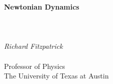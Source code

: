 \documentclass[12pt]{rfbook}
\def\theequation{\arabic{chapter}.\arabic{equation}}
\def\thefigure{\arabic{chapter}.\arabic{figure}}
\def\thetable{\arabic{chapter}.\arabic{table}}
\begin{document}
\thispagestyle{empty}
\begin{center}
{\Huge\bf Newtonian Dynamics}\\[1ex]
~\\
~\\
~\\
{\Large\em  Richard Fitzpatrick}\\[1.5ex]~\\[1.5ex]
{\Large\sf  Professor  of Physics}\\[1.5ex]
{\Large\sf  The University of Texas at Austin}
\end{center}

\pagestyle{fancy}
\renewcommand{\chaptermark}[1]{\markboth{#1}{}}
\fancyhf{}
\fancyhead[LO,RE]{\sl \leftmark}
\fancyhead[LE,RO]{\sl \thepage}

\tableofcontents

















\appendix
\def\theequation{\Alph{chapter}.\arabic{equation}}
\def\thefigure{\Alph{chapter}.\arabic{figure}}
\def\thetable{\Alph{chapter}.\arabic{table}}

\end{document}
